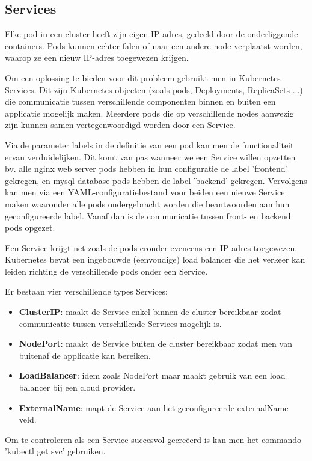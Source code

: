 \subsection{Services}
\label{sec:services}

Elke pod in een cluster heeft zijn eigen IP-adres, gedeeld door de onderliggende containers. Pods kunnen echter falen of naar een andere node verplaatst worden, waarop ze een nieuw IP-adres toegewezen krijgen.

Om een oplossing te bieden voor dit probleem gebruikt men in Kubernetes Services. Dit zijn Kubernetes objecten (zoals pods, Deployments, ReplicaSets ...) die communicatie tussen verschillende componenten binnen en buiten een applicatie mogelijk maken. Meerdere pods die op verschillende nodes aanwezig zijn kunnen samen vertegenwoordigd worden door een Service. 

Via de parameter labels in de definitie van een pod kan men de functionaliteit ervan verduidelijken. Dit komt van pas wanneer we een Service willen opzetten bv. alle nginx web server pods hebben in hun configuratie de label 'frontend' gekregen, en mysql database pods hebben de label 'backend' gekregen. Vervolgens kan men via een YAML-configuratiebestand voor beiden een nieuwe Service maken waaronder alle pods ondergebracht worden die beantwoorden aan hun geconfigureerde label. Vanaf dan is de communicatie tussen front- en backend pods opgezet. 

Een Service krijgt net zoals de pods eronder eveneens een IP-adres toegewezen. Kubernetes bevat een ingebouwde (eenvoudige) load balancer die het verkeer kan leiden richting de verschillende pods onder een Service. 

Er bestaan vier verschillende types Services: 
\begin{itemize}
    \item {\bf ClusterIP}: maakt de Service enkel binnen de cluster bereikbaar zodat communicatie tussen verschillende Services mogelijk is.  
    \item {\bf NodePort}: maakt de Service buiten de cluster bereikbaar zodat men van buitenaf de applicatie kan bereiken.
    \item {\bf LoadBalancer}: idem zoals NodePort maar maakt gebruik van een load balancer bij een cloud provider.
    \item {\bf ExternalName}: mapt de Service aan het geconfigureerde externalName veld.     
\end{itemize}

Om te controleren als een Service succesvol gecreëerd is kan men het commando 'kubectl get svc' gebruiken.

